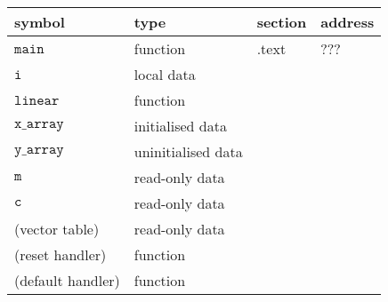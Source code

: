 \begin{tabular}{|l|l|l|l|}
	\hline
	\textbf{\large symbol} & \textbf{\large type} & \textbf{\large section} & \textbf{\large address} \\
	\hline
	\(\texttt{main}\)      & function             & .text                   & ???                     \\
	\hline
	\(\texttt{i}\)         & local data           &                         &                         \\
	\hline
	\(\texttt{linear}\)    & function             &                         &                         \\
	\hline
	\(\texttt{x\_array}\)  & initialised data     &                         &                         \\
	\hline
	\(\texttt{y\_array}\)  & uninitialised data   &                         &                         \\
	\hline
	\(\texttt{m}\)         & read-only data       &                         &                         \\
	\hline
	\(\texttt{c}\)         & read-only data       &                         &                         \\
	\hline
	(vector table)         & read-only data       &                         &                         \\
	\hline
	(reset handler)        & function             &                         &                         \\
	\hline
	(default handler)      & function             &                         &                         \\
	\hline
\end{tabular}
